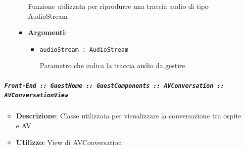 \documentclass[../DefinizioneDiProdotto.tex]{subfiles}
\begin{document}
\begin{itemize}
\begin{itemize}
\begin{itemize}
	 Funzione utilizzata per riprodurre una traccia audio di tipo AudioStream

	\item \textbf{Argomenti}:
	\begin{itemize}
	\item \texttt{audioStream : AudioStream}\

	 Parametro che indica la traccia audio da gestire.
	\end{itemize}
	\end{itemize}\vspace{0.5em}
	\end{itemize}\subparagraph{\texttt{Front-End :: GuestHome :: GuestComponents :: AVConversation :: AVConversationView}}
	\begin{itemize}\item \textbf{Descrizione}: Classe utilizzata per visualizzare la conversazione tra ospite e AV
	\item \textbf{Utilizzo}: View di AVConversation
	\end{itemize}\end{itemize}

	\newpage
\end{document}
